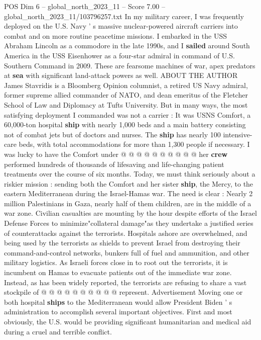 \begin{textsample}{POS Dim 6 – global\_north\_2023\_11 – Score 7.00 – global\_north\_2023\_11/103796257.txt}  \label{ex:f6_pos_252}
In my military career, I was frequently deployed on the U.S.
Navy ' s massive nuclear-powered aircraft carriers into combat and on more routine peacetime missions.
I embarked in the USS Abraham Lincoln as a commodore in the late 1990s, and I \textbf{sailed} around South America in the USS Eisenhower as a four-star admiral in command of U.S.
Southern Command in 2009.
These are fearsome machines of war, apex predators at \textbf{sea} with significant land-attack powers as well.
ABOUT THE AUTHOR James Stavridis is a Bloomberg Opinion columnist, a retired US Navy admiral, former supreme allied commander of NATO, and dean emeritus of the Fletcher School of Law and Diplomacy at Tufts University.
But in many ways, the most satisfying deployment I commanded was not a carrier : It was USNS Comfort, a 60,000-ton hospital \textbf{ship} with nearly 1,000 beds and a main battery consisting not of combat jets but of doctors and nurses.
The \textbf{ship} has nearly 100 intensive-care beds, with total accommodations for more than 1,300 people if necessary.
I was lucky to have the Comfort under @ @ @ @ @ @ @ @ @ @ her \textbf{crew} performed hundreds of thousands of lifesaving and life-changing patient treatments over the course of six months.
Today, we must think seriously about a riskier mission : sending both the Comfort and her sister \textbf{ship}, the Mercy, to the eastern Mediterranean during the Israel-Hamas war.
The need is clear : Nearly 2 million Palestinians in Gaza, nearly half of them children, are in the middle of a war zone.
Civilian casualties are mounting by the hour despite efforts of the Israel Defense Forces to minimize"collateral damage"as they undertake a justified series of counterattacks against the terrorists.
Hospitals ashore are overwhelmed, and being used by the terrorists as shields to prevent Israel from destroying their command-and-control networks, bunkers full of fuel and ammunition, and other military logistics.
As Israeli forces close in to root out the terrorists, it is incumbent on Hamas to evacuate patients out of the immediate war zone.
Instead, as has been widely reported, the terrorists are refusing to share a vast stockpile of @ @ @ @ @ @ @ @ @ @ represent.
Advertisement Moving one or both hospital \textbf{ships} to the Mediterranean would allow President Biden ' s administration to accomplish several important objectives.
First and most obviously, the U.S. would be providing significant humanitarian and medical aid during a cruel and terrible conflict.

\end{textsample}
